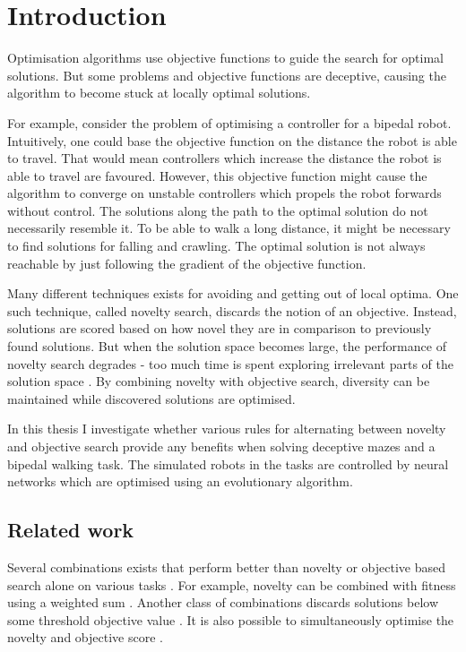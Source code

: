 \section{Introduction}

\label{sec:intro}

Optimisation algorithms use objective functions to guide the search for optimal solutions.
But some problems and objective functions are deceptive, causing the algorithm to become stuck at
locally optimal solutions.

For example, consider the problem of optimising a controller for a bipedal
robot. Intuitively, one could base the objective function on the distance the robot is able to travel.
That would mean controllers which increase the distance the robot is able to travel are favoured.
However, this objective function might cause the algorithm to converge on unstable controllers which
propels the robot forwards without control. The solutions along the path to the optimal solution
do not necessarily resemble it. To be able to walk a long distance, it might be necessary to find
solutions for falling and crawling. The optimal solution is not always reachable by just
following the gradient of the objective function.

Many different techniques exists for avoiding and getting out of local optima. One such technique, called
novelty search, discards the notion of an objective. Instead, solutions are scored based on how novel
they are in comparison to previously found solutions. But when the solution space becomes large, the performance
of novelty search degrades - too much time is spent exploring irrelevant parts of the solution space \cite{novelty_not_enough}.
By combining novelty with objective search, diversity can be maintained while
discovered solutions are optimised.

In this thesis I investigate whether various rules for alternating between novelty and
objective search provide any benefits when solving deceptive mazes and a bipedal
walking task. The simulated robots in the tasks are controlled by neural networks
which are optimised using an evolutionary algorithm.

\subsection{Related work}
Several combinations exists that perform better than novelty or objective based search alone
on various tasks \cite{ns_study}. For example, novelty can be combined with fitness using a
weighted sum \cite{novelty_not_enough}. Another class of combinations discards solutions below
some threshold objective value \cite{minimal_ns}. It is also possible to simultaneously optimise
the novelty and objective score \cite{multi_ns}.
